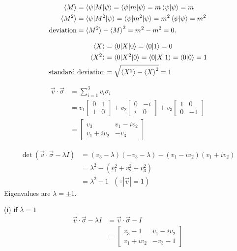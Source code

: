 \begin{align*}
	\braket{M} &= \braket{ \psi | M | \psi} = \braket{\psi | m | \psi} = m \braket{\psi | \psi} = m\\
	\braket{M^2} &= \braket{ \psi | M^2 | \psi} = \braket{\psi | m^2 | \psi} = m^2 \braket{\psi | \psi} = m^2\\
	\text{deviation} &= \braket{M^2} - \braket{M}^2 = m^2 - m^2 = 0.
\end{align*}


\begin{align*}
	\braket{X} &= \braket{0 | X | 0} = \braket{0 | 1} = 0\\
	\braket{X^2} &= \braket{0 | X^2 | 0} = \braket{0 | X | 1} =\braket{0 | 0} = 1\\
	\text{standard deviation} &= \sqrt{ \braket{X^2} - \braket{X}^2 } = 1
\end{align*}


\begin{align*}
    \vec{v} \cdot \vec{\sigma} &= \sum_{i=1}^3 v_i \sigma_i\\
    &= v_1 \begin{bmatrix}
        0 & 1 \\
        1 & 0
    \end{bmatrix}
    + v_2 \begin{bmatrix}
        0 & -i \\
        i & 0
    \end{bmatrix}
    + v_3 \begin{bmatrix}
        1 & 0 \\
        0 & -1
    \end{bmatrix} \\
    &= \begin{bmatrix}
        v_3 & v_1 - i v_2 \\
        v_1 + iv_2 & -v_3
    \end{bmatrix}
\end{align*}

\begin{align*}
    \det (\vec{v} \cdot \vec{\sigma}  - \lambda I) &= (v_3 - \lambda) (-v_3 - \lambda) - (v_1 - iv_2) (v_1 + iv_2)\\
    &= \lambda^2 - (v_1^2 + v_2^2  + v_3^2)\\
    &= \lambda^2 - 1 ~~~ (\because |\vec{v}| = 1)
\end{align*}
Eigenvalues are $\lambda = \pm 1$.


(i) if $\lambda = 1$
\begin{align*}
	\vec{v} \cdot \vec{\sigma}  - \lambda I &= \vec{v} \cdot \vec{\sigma}  - I\\
		&= \begin{bmatrix}
    		v_3 - 1 & v_1 - i v_2 \\
    		v_1 + i v_2 & - v_3 - 1
		\end{bmatrix}
\end{align*}

